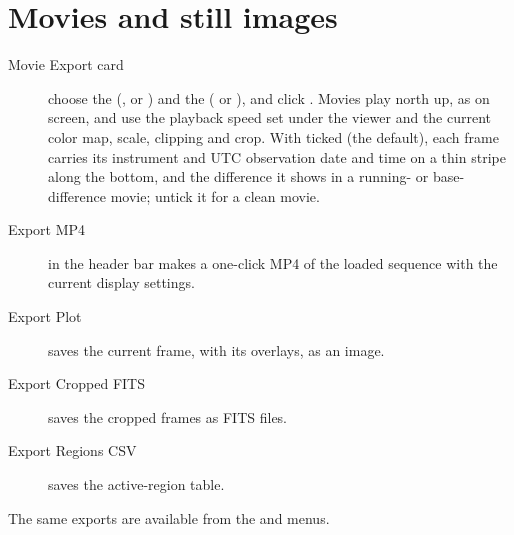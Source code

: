 \section{Movies and still images}
\label{sec:solar-movies}

\begin{description}
  \item[Movie Export card] choose the  (, 
    or ) and the  ( or ), and click
    . Movies play north up, as on screen, and use the
    playback speed set under the viewer and the current color map, scale, clipping and crop.
    With  ticked (the default), each frame carries
    its instrument and UTC observation date and time on a thin stripe along the bottom, and
    the difference it shows in a running- or base-difference movie; untick it for a clean
    movie.
  \item[Export MP4] in the header bar makes a one-click MP4 of the loaded sequence with the
    current display settings.
  \item[Export Plot] saves the current frame, with its overlays, as an image.
  \item[Export Cropped FITS] saves the cropped frames as FITS files.
  \item[Export Regions CSV] saves the active-region table.
\end{description}
The same exports are available from the  and  menus.
